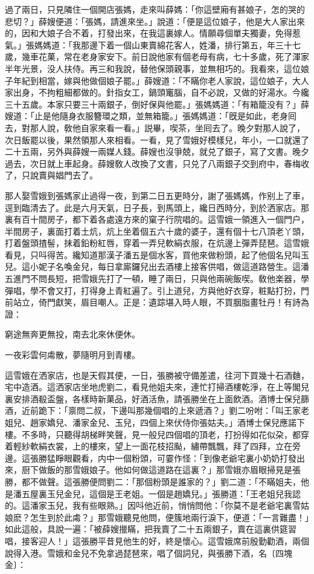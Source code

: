 過了兩日，只見隣住一個開店張媽，走來叫薛媽：「你這壁廂有甚娘子，怎的哭的悲切？」薛嫂便道：「張媽，請進來坐。」說道：「便是這位娘子，他是大人家出來的，因和大娘子合不着，打發出來，在我這裏嫁人。情願尋個單夫獨妻，免得惹氣。」張媽媽道：「我那邊下着一個山東賣綿花客人，姓潘，排行第五，年三十七歲，幾車花菓，常在老身家安下。前日說他家有個老母有病，七十多歲，死了渾家半年光景，没人扶侍。再三和我說，替他保頭親事，並無相巧的。我看來，這位娘子年紀到相當，嫁與他做個娘子罷。」薛嫂道：「不瞞你老人家說，這位娘子，大人家出身，不拘粗細都做的。針指女工，鍋頭竃腦，自不必說，又做的好湯水。今纔三十五歲。本家只要三十兩銀子，倒好保與他罷。」張媽媽道：「有箱籠没有？」薛嫂道：「止是他隨身衣服簪環之類，並無箱籠。」張媽媽道：「旣是如此，老身囘去，對那人說，敎他自家來看一看。」説畢，喫茶，坐囘去了。晚夕對那人說了，次日飯罷以後，果然領那人來相看。一看，見了雪娥好模樣兒，年小，一口就還了二十五兩，另外與薛嫂一兩媒人錢。薛嫂也沒爭兢，就兑了銀子，寫了文書。晚夕過去，次日就上車起身。薛嫂敎人改換了文書，只兑了八兩銀子交到府中，春梅收了，只說賣與娼門去了。

那人娶雪娥到張媽家止過得一夜，到第二日五更時分，謝了張媽媽，作别上了車，逕到臨清去了。此是六月天氣，日子長，到馬頭上，纔日西時分，到於洒家店。那裏有百十間房子，都下着各處遠方來的窠子行院唱的。這雪娥一領進入一個門户，半間房子，裏面打着土炕，炕上坐着個五六十歲的婆子，還有個十七八頂老丫頭，打着盤頭揸髻，抹着鉛粉紅唇，穿着一弄兒軟絹衣服，在炕邊上彈弄琵琶。這雪娥看見，只呌得苦。纔知道那漢子潘五是個水客，買他來做粉頭，起了他個名兒叫玉兒。這小妮子名喚金兒，每日拿廝鑼兒出去酒樓上接客供唱，做這道路營生。這潘五進門不問長短，把雪娥先打了一頓，睡了兩日，只與他兩碗飯喫。敎他楽器，學彈唱，學不會又打，打得身上青紅遍了。引上道兒，方與他好衣穿，粧點打扮，門前站立，倚門獻笑，眉目嘲人。正是：遺踪堪入時人眼，不買胭脂畫牡丹！有詩為證：

\begin{myquote}
窮途無奔更無投，南去北來休便休。

一夜彩雲何䖏散，夢隨明月到青樓。
\end{myquote}

這雪娥在洒家店，也是天假其便，一日，張勝被守備差遣，往河下買幾十石酒麯，宅中造酒。這洒家店坐地虎劉二，看見他姐夫來，連忙打掃酒樓乾淨，在上等閣兒裏安排酒殽盃盤，各樣時新菓品，好酒活魚，請張勝坐在上面飲酒。酒博士保兒篩酒，近前跪下：「禀問二叔，下邊叫那幾個唱的上來遞酒？」劉二吩咐：「叫王家老姐兒、趙家嬌兒、潘家金兒、玉兒，四個上來伏侍你張姑夫。」酒博士保兒應諾下樓。不多時，只聽得胡梯畔笑聲，見一般兒四個唱的頂老，打扮得如花似朶，都穿着輕紗軟絹衣裳，上的樓來，望上一面花枝招颭，繡帶飄飄，拜了四拜，立在旁邊。這張勝猛睜眼觀看，内中一個粉頭，可霎作怪：「到像老爺宅裏小奶奶打發出來，厨下做飯的那雪娥娘子。他如何做這道路在這裏？」那雪娥亦眉眼掃見是張勝，都不做聲。這張勝便問劉二：「那個粉頭是誰家的？」劉二道：「不瞞姐夫，他是潘五屋裏玉兒金兒，這個是王老姐。一個是趙嬌兒。」張勝道：「王老姐兒我認的。這潘家玉兒，我有些眼熟。」因呌他近前，悄悄問他：「你莫不是老爺宅裏雪姑娘麽？怎生到於此䖏？」那雪娥聽見他問，便簇地兩行淚下，便道：「一言難盡！」如此這般，具說一遍：「被薛嫂擸瞞，把我賣了二十五兩銀子，賣在這裏供筵習唱，接客迎人！」這張勝平昔見他生的好，終是懷心。這雪娥席前殷勤勸酒，兩個說得入港。雪娥和金兒不免拿過琵琶來，唱了個詞兒，與張勝下酒，名〔四塊金〕：

